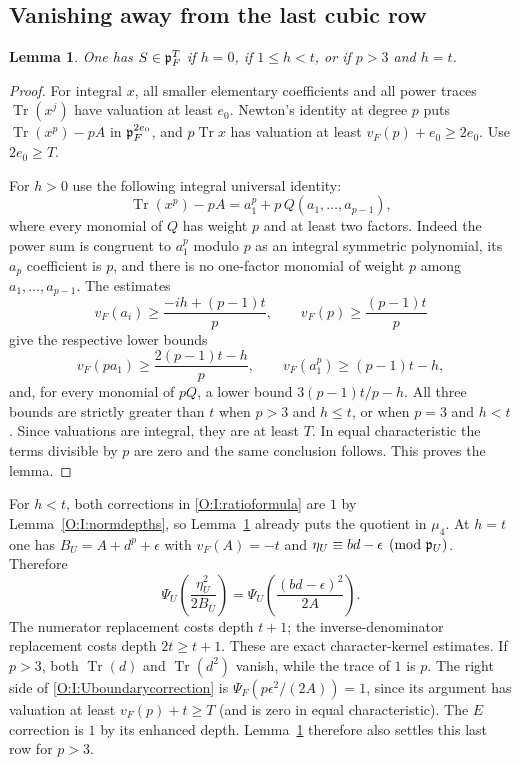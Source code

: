 \documentclass[11pt]{amsart}
\newtheorem{lemma}[theorem]{Lemma}
\theoremstyle{definition}
\theoremstyle{remark}
\newcommand{\Tr}{\operatorname{Tr}}
\begin{document}
\subsection{Vanishing away from the last cubic row}
\begin{lemma}\label{O:I:Sdepth}
One has $S\in\mathfrak p_F^T$ if $h=0$, if $1\le h<t$, or if $p>3$ and
$h=t$.
\end{lemma}
\begin{proof}
For integral $x$, all smaller elementary coefficients and all power traces
$\Tr(x^j)$ have valuation at least $e_0$. Newton's identity at degree $p$
puts $\Tr(x^p)-pA$ in $\mathfrak p_F^{2e_0}$, and $p\Tr x$ has valuation at least
$v_F(p)+e_0\ge2e_0$. Use $2e_0\ge T$.

For $h>0$ use the following integral universal identity:
\[
 \Tr(x^p)-pA=a_1^p+p\,Q(a_1,\ldots,a_{p-1}),
\]
where every monomial of $Q$ has weight $p$ and at least two factors.
Indeed the power sum is congruent to $a_1^p$ modulo $p$ as an integral
symmetric polynomial, its $a_p$ coefficient is $p$, and there is no
one-factor monomial of weight $p$ among $a_1,\ldots,a_{p-1}$.
The estimates
\[
 v_F(a_i)\ge\frac{-ih+(p-1)t}{p},\qquad
 v_F(p)\ge\frac{(p-1)t}{p}
\]
give the respective lower bounds
\[
 v_F(pa_1)\ge\frac{2(p-1)t-h}{p},\qquad
 v_F(a_1^p)\ge(p-1)t-h,
\]
and, for every monomial of $pQ$, a lower bound
$3(p-1)t/p-h$.
All three bounds are strictly greater than $t$ when $p>3$ and $h\le t$,
or when $p=3$ and $h<t$. Since valuations are integral, they are at least
$T$. In equal characteristic the terms divisible by $p$ are zero and the
same conclusion follows. This proves the lemma.
\end{proof}

For $h<t$, both corrections in \eqref{O:I:ratioformula} are $1$ by
Lemma~\ref{O:I:normdepths}, so Lemma~\ref{O:I:Sdepth} already puts the quotient
in $\mu_4$.
At $h=t$ one has $B_U=A+d^p+\epsilon$ with $v_F(A)=-t$ and
$\eta_U\equiv b d-\epsilon\pmod{\mathfrak p_U}$. Therefore
\begin{equation}\label{O:I:Uboundarycorrection}
 \Psi_U\!\left(\frac{\eta_U^2}{2B_U}\right)
 =\Psi_U\!\left(\frac{(bd-\epsilon)^2}{2A}\right).
\end{equation}
The numerator replacement costs depth $t+1$; the inverse-denominator
replacement costs depth $2t\ge t+1$. These are exact character-kernel
estimates. If $p>3$, both $\Tr(d)$ and $\Tr(d^2)$ vanish, while the trace
of $1$ is $p$. The right side of \eqref{O:I:Uboundarycorrection} is
$\Psi_F(p\epsilon^2/(2A))=1$, since its argument has valuation at least
$v_F(p)+t\ge T$ (and is zero in equal characteristic).
The $E$ correction is $1$ by its enhanced depth. Lemma~\ref{O:I:Sdepth}
therefore also settles this last row for $p>3$.
\end{document}
